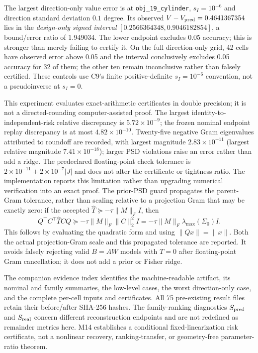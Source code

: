 The largest direction-only value error is at
\texttt{obj\_19\_cylinder}, $s_I=10^{-6}$ and direction standard deviation
$0.1$ degree.  Its observed $V-V_{\rm pred}=0.4641367354$ lies in the
\emph{design-only signed interval}
$[0.2566364348,0.9046182854]$, a bound/error ratio of 1.949034.
The lower endpoint excludes 0.05 accuracy; this is stronger than merely
failing to certify it.  On the full direction-only grid, 42 cells have
observed error above 0.05 and the interval conclusively excludes 0.05
accuracy for 32 of them; the other ten remain inconclusive rather than
falsely certified.  These controls use C9's finite positive-definite
$s_I=10^{-6}$ convention, not a pseudoinverse at $s_I=0$.

This experiment evaluates exact-arithmetic certificates in double precision;
it is not a directed-rounding computer-assisted proof.  The largest
identity-to-independent-risk relative discrepancy is
$5.72\mathbin{\times}10^{-9}$; the frozen nominal endpoint replay discrepancy
is at most $4.82\mathbin{\times}10^{-10}$.  Twenty-five negative Gram
eigenvalues attributed to roundoff are recorded, with largest magnitude
$2.83\mathbin{\times}10^{-11}$ (largest relative magnitude
$7.41\mathbin{\times}10^{-18}$); larger PSD violations raise an error rather
than add a ridge.  The predeclared floating-point check tolerance is
$2\mathbin{\times}10^{-11}+2\mathbin{\times}10^{-7}|J|$ and does not alter the
certificate or tightness ratio.  The implementation reports this limitation
rather than upgrading numerical verification into an exact proof.
The prior-PSD guard propagates the parent-Gram tolerance, rather than scaling
relative to a projection Gram that may be exactly zero: if the accepted
$\widehat T\succeq-\tau\|M\|_F I$, then
\[
 Q^\top C^\top\widehat T C Q\succeq
 -\tau\|M\|_F\|C\|_2^2 I
 =-\tau\|M\|_F\lambda_{\max}(\Sigma_0)I.
\]
This follows by evaluating the quadratic form and using $\|Qx\|=\|x\|$.
Both the actual projection-Gram scale and this propagated tolerance are
reported.  It avoids falsely rejecting valid $B=AW$ models with $T=0$ after
floating-point Gram cancellation; it does not add a prior or Fisher ridge.

The companion evidence index identifies the machine-readable artifact,
its nominal and family summaries, the low-level cases, the worst direction-only
case, and the complete per-cell inputs and certificates.
All 75 pre-existing result files retain their before/after SHA-256 hashes.
The family-ranking diagnostics
$S_{\rm pred}$ and $S_{\rm real}$ concern different reconstruction endpoints
and are not redefined as remainder metrics here.  M14 establishes a
conditional fixed-linearization risk certificate, not a nonlinear recovery,
ranking-transfer, or geometry-free parameter-ratio theorem.
